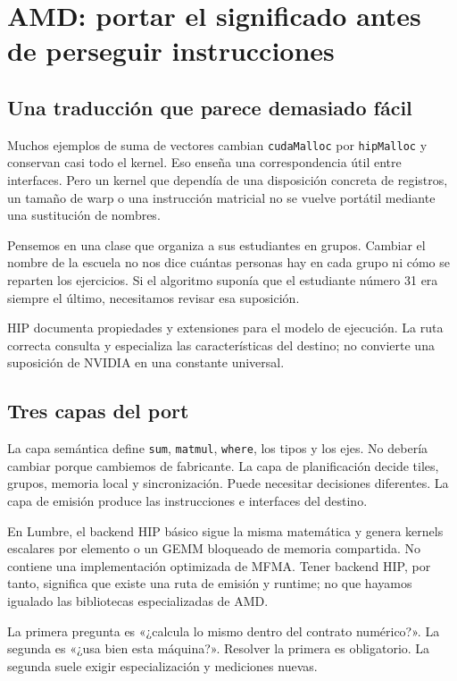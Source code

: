 \documentclass[12pt,a4paper,oneside]{report}
\begin{document}
\chapter{AMD: portar el significado antes de perseguir instrucciones}
\label{ch:amd}
\section{Una traducción que parece demasiado fácil}
Muchos ejemplos de suma de vectores cambian \texttt{cudaMalloc} por \texttt{hipMalloc} y conservan casi todo el kernel. Eso enseña una correspondencia útil entre interfaces. Pero un kernel que dependía de una disposición concreta de registros, un tamaño de warp o una instrucción matricial no se vuelve portátil mediante una sustitución de nombres.

Pensemos en una clase que organiza a sus estudiantes en grupos. Cambiar el nombre de la escuela no nos dice cuántas personas hay en cada grupo ni cómo se reparten los ejercicios. Si el algoritmo suponía que el estudiante número 31 era siempre el último, necesitamos revisar esa suposición.

HIP documenta propiedades y extensiones para el modelo de ejecución. La ruta correcta consulta y especializa las características del destino; no convierte una suposición de NVIDIA en una constante universal. \cite{hip}

\section{Tres capas del port}
La capa semántica define \texttt{sum}, \texttt{matmul}, \texttt{where}, los tipos y los ejes. No debería cambiar porque cambiemos de fabricante. La capa de planificación decide tiles, grupos, memoria local y sincronización. Puede necesitar decisiones diferentes. La capa de emisión produce las instrucciones e interfaces del destino.

En Lumbre, el backend HIP básico sigue la misma matemática y genera kernels escalares por elemento o un GEMM bloqueado de memoria compartida. No contiene una implementación optimizada de MFMA. Tener backend HIP, por tanto, significa que existe una ruta de emisión y runtime; no que hayamos igualado las bibliotecas especializadas de AMD.

\begin{traduccion}
La primera pregunta es «¿calcula lo mismo dentro del contrato numérico?». La segunda es «¿usa bien esta máquina?». Resolver la primera es obligatorio. La segunda suele exigir especialización y mediciones nuevas.

\end{traduccion}
\end{document}
